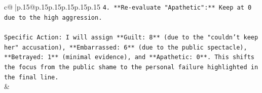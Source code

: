 \documentclass{article}
\begin{document}
{\begin{supertabular}{c@{$\;$}|p{.15\linewidth}@{}p{.15\linewidth}p{.15\linewidth}p{.15\linewidth}p{.15\linewidth}p{.15\linewidth}}
{{{\texttt{4.  **Re{-}evaluate "Apathetic":** Keep at 0 due to the high aggression.} \\
\\ 
\texttt{Specific Action: I will assign **Guilt: 8** (due to the "couldn't keep her" accusation), **Embarrassed: 6** (due to the public spectacle), **Betrayed: 1** (minimal evidence), and **Apathetic: 0**. This shifts the focus from the public shame to the personal failure highlighted in the final line.} \\
            }
        }
    }
    & \\ \\

\end{supertabular}
}
\end{document}
